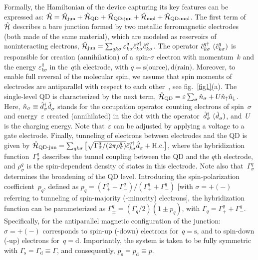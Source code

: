 \documentclass[doublecol]{epl2} %
\newcommand{\e}{\varepsilon}
\newcommand{\s}{\sigma}
\newcommand{\G}{\Gamma}
\newcommand{\up}{\uparrow}
\newcommand{\down}{\downarrow}
\newcommand{\Ham}{\skew{3}{\hat}{\mathcal{H}}}
\newcommand{\opc}{\skew{1}{\hat}{c}}
\newcommand{\opn}{\skew{1}{\hat}{n}}
\newcommand{\opd}{\skew{3}{\hat}{d}}
\begin{document}
%
Formally, the Hamiltonian of the device capturing its key features can be expressed as:
%
$
	\Ham
	=
	\Ham_\text{jun}
	+
	\Ham_\text{QD}
	+
	\Ham_\text{QD-jun}
	+
	\Ham_\text{mol}
	+
	\Ham_\text{QD-mol}
$.
%
The first term of~$\Ham$ describes a bare junction formed by two metallic ferromagnetic electrodes (both made of the same material), which are modeled as reservoirs of noninteracting electrons,
%
$
	\Ham_\text{jun}
	=
	\sum_{qk\s}
	\e_{k\s}^q
	\opc^{q\dag}_{k\s}
	\opc_{k\s}^{q}
$.
%
The operator $\opc^{q\dag}_{k\s}\ (\opc^{q}_{k\s})$ is responsible for creation (annihilation) of a spin-$\s$ electron with momentum~$k$ and the energy $\e_{k\s}^q$ in the~$q$th electrode, with \mbox{$q=\text{s(ource)},\text{d(rain)}$}.
%
Moreover, to enable full reversal of the molecular spin, we assume that spin moments of electrodes are antiparallel with respect to each other~\cite{Misiorny2009Jun}, see fig.~\ref{fig1}(a).
%
The single-level QD is characterized by the next term,
%
$
	\Ham_\text{QD}
	=
	\e
	\sum_\s
	\opn_\s
	+
	U
	\opn_\up
	\opn_\down
$.
%
Here, \mbox{$\opn_\s\equiv\opd_\s^\dagger\opd_\s^{}$} stands for the occupation operator counting electrons of spin~$\s$ and energy~$\e$ created (annihilated) in the dot with the operator~$\opd_\s^\dagger\ (\opd_\s^{})$, and~$U$ is the charging energy. Note that~$\e$ can be   adjusted by applying a voltage to a gate electrode.
%
Finally, tunneling of electrons between electrodes and the QD is given by
%
$
  \Ham_\text{QD-jun}
  =
  \sum_{qk\sigma}
  \big[
  \sqrt{\G_\s^q/(2\pi\rho_\s^q)}
  \opc^{q\dagger}_{k\sigma}
  \opd_{\sigma}^{}
  +
  \text{H.c.}
  \big]
$,
%
where the hybridization function~$\G_\s^q$ describes the tunnel coupling between the QD and the $q$th electrode, and $\rho_\s^q$ is the spin-dependent density of states in this electrode. Note also that~$\G_\s^q$ determines the broadening of the QD level.
%
Introducing the spin-polarization coefficient~$p_q$, defined as
%
$	
	p_q
	=
	(\G_+^q-\G_-^q)/(\G_+^q+\G_-^q)
$
%
[with \mbox{$\s=+(-)$} referring to tunneling of spin-majority (-minority) electrons], the hybridization function can be parameterized as \mbox{$\G_\pm^q = (\G_q/2)(1\pm p_q)$}, with $\G_q = \G_+^q+\G_-^q$. Specifically, for the antiparallel magnetic configuration of the junction: \mbox{$\s=+(-)$} corresponds to spin-up (-down) electrons for~\mbox{$q=\text{s}$}, and to spin-down (-up) electrons for~\mbox{$q=\text{d}$}.
%
Importantly, the system is taken to be fully symmetric with  \mbox{$\G_\text{s}=\G_\text{d}\equiv \G$}, and consequently, \mbox{$p_\text{s}=p_\text{d}\equiv p$}.
\end{document}
